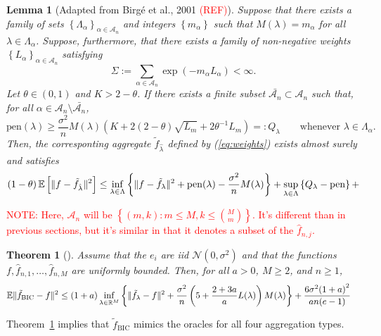 \documentclass[11pt, letter paper]{article}
\newcommand{\1}{\mathmybb{1}}
\newtheorem{theorem}[proposition]{Theorem}
\newtheorem{lemma}[proposition]{Lemma}
\newcommand{\R}{\mathbb{R}}
\newcommand{\0}{\emptyset}
\newcommand{\E}{\mathbb{E}}
\newcommand{\Ep}[1]{\mathbb{E}\left[ #1 \right]}
\newcommand{\paren}[1]{\left(#1 \right)}
\newcommand{\set}[1]{\left\{ #1 \right\}}
\newcommand{\norm}[1]{|\hspace{-1pt}|#1 |\hspace{-1pt}|}
\newcommand{\normsq}[1]{\norm{#1}^{2}}
\newcommand{\Acal}{\mathcal{A}_{n}}
\newcommand{\Ncal}{\mathcal{N}}
\newcommand{\fhat}[2]{\hat{f}_{#1, #2}}
\newcommand{\ftilde}[1]{\tilde{f}_{#1}}
\newcommand{\lambdahat}[1]{\hat{\lambda}_{#1}}
\begin{document}
\begin{lemma}[Adapted from Birgé et al., 2001 \textcolor{red}{(REF)}]\label{lemm:birge}
    Suppose that there exists a family of sets \(\set{\Lambda_{\alpha}}_{\alpha\in\Acal}\) and integers \(\set{m_{\alpha}}\) such that \(M(\lambda) = m_{\alpha}\) for all \(\lambda\in\Lambda_{\alpha}\). Suppose, furthermore, that there exists a family of non-negative weights \(\set{L_{\alpha}}_{\alpha\in\Acal}\) satisfying 
    \[\Sigma:=\sum_{\alpha\in\Acal}\exp\paren{-m_{\alpha}L_{\alpha}}<\infty.\]
    Let \(\theta\in(0,1)\) and \(K>2-\theta\). If there exists a finite subset \(\bar{\Acal}\subset\Acal\) such that, for all \(\alpha\in\Acal\setminus\bar{\Acal}\), 
    \[\mathrm{pen}(\lambda)\geq \frac{\sigma^2}{n}M(\lambda)\paren{K + 2(2-\theta)\sqrt{L_{m}} +2{\theta^{-1}}L_{m}} =: Q_{\lambda}\qquad\text{whenever }\lambda\in\Lambda_{\alpha}.\]
    Then, the corresponting aggregate \(\ftilde{\lambdahat{}}\) defined by (\ref{eq:weights}) exists almost surely and satisfies
    \begin{equation}
        \paren{1-\theta}\Ep{\normsq{f - \ftilde{\lambdahat{}}}} \leq \inf_{\lambda\in\Lambda}\set{\normsq{f - \ftilde{\lambda}} + \mathrm{pen}(\lambda) - \frac{\sigma^2}{n}M(\lambda)} + \sup_{\lambda\in\Lambda}\set{Q_{\lambda} - \mathrm{pen}} + 
    \end{equation}

\end{lemma}
\textcolor{red}{NOTE: Here, \(\Acal\) will be \(\set{(m,k):m\leq M, k\leq \binom{M}{m}}\). It's different than in previous sections, but it's similar in that it denotes a subset of the \(\fhat{n}{j}\).}

\begin{theorem}[\cite{bunea_2007}]\label{prop:buneath31}
    Assume that the \(e_{i}\) are iid \(\Ncal(0, \sigma^{2})\) and that the functions \(f, \fhat{n}{1}, \ldots, \fhat{n}{M}\) are uniformly bounded. Then, for all \(a>0\), \(M\geq 2\), and \(n\geq 1\),
    \begin{align*}
        \E\normsq{\ftilde{\mathrm{BIC}} - f} &\leq (1+a)\inf_{\lambda\in\R^{M}}\set{\normsq{\ftilde{\lambda} - f} + \frac{\sigma^{2}}{n}\paren{5+\frac{2+3a}{a}{L(\lambda)}}M(\lambda)} + \frac{6\sigma^{2}{(1+a)}^{2}}{an(e-1)}
    \end{align*}

\end{theorem}

Theorem~\ref{prop:buneath31} implies that \(\ftilde{\mathrm{BIC}}\) mimics the oracles for all four aggregation types.

\newpage
\printbibliography{}
\end{document}
